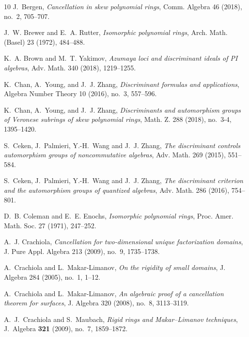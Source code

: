 \documentclass{amsart}
\theoremstyle{plain}
\numberwithin{theorem}{section}
\numberwithin{equation}{theorem}
\theoremstyle{definition}
\begin{document}
\begin{thebibliography}{10}
J.~Bergen,
\emph{Cancellation in skew polynomial rings},
Comm. Algebra 46 (2018), no.~2, 705--707.


J.~W. Brewer and E.~A. Rutter,
\emph{Isomorphic polynomial rings},
Arch. Math. (Basel) 23 (1972), 484--488.

K.~A. Brown and M.~T. Yakimov,
\emph{Azumaya loci and discriminant ideals of PI algebras},
Adv. Math. 340 (2018), 1219--1255.

K.~Chan, A.~Young, and J.~J. Zhang,
\emph{Discriminant formulas and applications},
Algebra Number Theory 10 (2016), no.~3, 557--596.

K.~Chan, A.~Young, and J.~J. Zhang,
\emph{Discriminants and automorphism groups of Veronese subrings of skew polynomial rings},
Math. Z. 288 (2018), no.~3-4, 1395--1420.



S.~Ceken, J.~Palmieri, Y.-H.~Wang and J.~J. Zhang,
\emph{The discriminant controls automorphism groups of noncommutative algebras},
Adv. Math. 269 (2015), 551--584.

S.~Ceken, J.~Palmieri, Y.-H.~Wang and J.~J. Zhang,
\emph{The discriminant criterion and the automorphism groups of quantized algebras},
Adv. Math. 286 (2016), 754--801.

D.~B. Coleman and E.~E. Enochs,
\emph{Isomorphic polynomial rings},
Proc. Amer. Math. Soc. 27 (1971), 247--252.



A.~J. Crachiola,
\emph{Cancellation for two-dimensional unique factorization domains},
J. Pure Appl. Algebra 213 (2009), no.~9, 1735--1738.


A.~Crachiola and L.~Makar-Limanov,
\emph{On the rigidity of small domains},
J. Algebra 284 (2005), no.~1, 1--12.

A.~Crachiola and L.~Makar-Limanov,
\emph{An algebraic proof of a cancellation theorem for surfaces},
J. Algebra 320 (2008), no.~8, 3113--3119.

A.~J.~Crachiola and S.~Maubach,
\emph{Rigid rings and Makar--Limanov techniques},
J.~Algebra \textbf{321} (2009), no.~7, 1859--1872.


\end{thebibliography}
\end{document}
